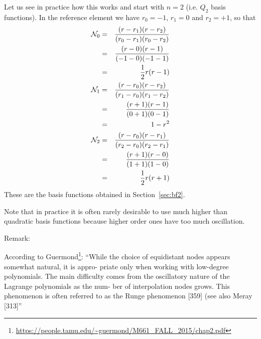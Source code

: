 Let us see in practice how this works and start with $n=2$ (i.e. $Q_2$ basis functions).
In the reference element we have $r_0=-1$, $r_1=0$ and $r_2=+1$, so that 
\begin{eqnarray}
{\mathcal{N}}_0 
&=& \frac{(r-r_1)(r-r_2)}{(r_0-r_1)(r_0-r_2)} \nonumber\\
&=& \frac{(r-0)(r-1)}{(-1-0)(-1-1)} \nonumber\\
&=& \frac12 r(r-1) \nonumber\\
{\mathcal{N}}_1
&=& \frac{(r-r_0)(r-r_2)}{(r_1-r_0)(r_1-r_2)} \nonumber\\
&=& \frac{(r+1)(r-1)}{(0+1)(0-1)} \nonumber\\
&=& 1-r^2 \nonumber\\
{\mathcal{N}}_2 
&=& \frac{(r-r_0)(r-r_1)}{(r_2-r_0)(r_2-r_1)} \nonumber\\
&=& \frac{(r+1)(r-0)}{(1+1)(1-0)} \nonumber\\
&=& \frac12 r(r+1) 
\end{eqnarray}
These are the basis functions obtained in Section~\ref{sec:bf2}.

Note that in practice it is often rarely desirable to use much higher 
than quadratic basis functions because higher order ones 
have too much oscillation.













\newpage

Remark:

According to Guermond\footnote{\url{https://people.tamu.edu/~guermond/M661_FALL_2015/chap2.pdf}}:
``While the choice of equidistant nodes appears somewhat natural, it is appro-
priate only when working with low-degree polynomials. The main diﬃculty
comes from the oscillatory nature of the Lagrange polynomials as the num-
ber of interpolation nodes grows. This phenomenon is often referred to as the
Runge phenomenon [359] (see also Meray [313]''
